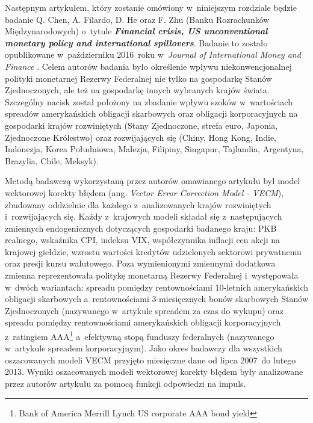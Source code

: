 Następnym artykułem, który zostanie omówiony w~niniejszym rozdziale będzie badanie Q. Chen, A. Filardo, D. He oraz F. Zhu (Banku Rozrachunków Międzynarodowych) o~tytule \textbf{\textit{Financial crisis, US unconventional monetary policy and international spillovers}}. Badanie to zostało opublikowane w~październiku 2016~roku w~\textit{Journal of International Money and Finance} \cite{chen36}. Celem autorów badania było określenie wpływu niekonwencjonalnej polityki monetarnej Rezerwy Federalnej nie tylko na gospodarkę Stanów Zjednoczonych, ale też na gospodarkę innych wybranych krajów świata. Szczególny nacisk został położony na zbadanie wpływu szoków w~wartościach spreadów amerykańskich obligacji skarbowych oraz obligacji korporacyjnych na gospodarki krajów rozwiniętych (Stany Zjednoczone, strefa euro, Japonia, Zjednoczone Królestwo) oraz rozwijających się (Chiny, Hong Kong, Indie, Indonezja, Korea Południowa, Malezja, Filipiny, Singapur, Tajlandia, Argentyna, Brazylia, Chile, Meksyk).

Metodą badawczą wykorzystaną przez autorów omawianego artykułu był model wektorowej korekty błędem (ang. \textit{Vector Error Correction Model - VECM}), zbudowany oddzielnie dla każdego z~analizowanych krajów rozwiniętych i~rozwijających się. Każdy z~krajowych modeli składał się z~następujących zmiennych endogenicznych dotyczących gospodarki badanego kraju: \acs{PKB} realnego, wskaźnika \acs{CPI}, indeksu \acs{VIX}, współczynnika inflacji cen akcji na krajowej giełdzie, wzrostu wartości kredytów udzielonych sektorowi prywatnemu oraz presji kursu walutowego. Poza wymienionymi zmiennymi dodatkowa zmienna reprezentowała politykę monetarną Rezerwy Federalnej i~występowała w~dwóch wariantach: spreadu pomiędzy rentownościami 10-letnich amerykańskich obligacji skarbowych a~rentownościami 3-miesięcznych bonów skarbowych Stanów Zjednoczonych (nazywanego w~artykule spreadem za czas do wykupu) oraz spreadu pomiędzy rentownościami amerykańskich obligacji korporacyjnych z~ratingiem AAA\footnote{Bank of America Merrill Lynch US corporate AAA bond yield} a~efektywną stopą funduszy federalnych (nazywanego w~artykule spreadem korporacyjnym). Jako okres badawczy dla wszystkich oszacowanych modeli \acs{VECM} przyjęto miesięczne dane od lipca 2007~do lutego 2013. Wyniki oszacowanych modeli wektorowej korekty błędem były analizowane przez autorów artykułu za pomocą funkcji odpowiedzi na impuls. 

